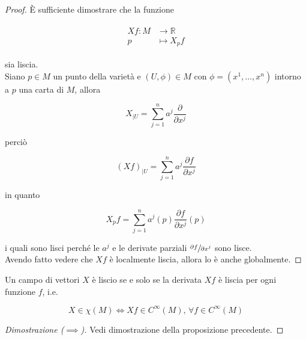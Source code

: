 \begin{proof}
	\`{E} sufficiente dimostrare che la funzione
	
	\begin{align}
		\begin{split}
			X f : M &\to \mathbb{R}\\
			p &\mapsto X_{p} f
		\end{split}
	\end{align}

	sia liscia.\\
	Siano $ p \in M $ un punto della varietà e $ (U,\phi) \in M $ con $ \phi = (x^{1},\dots,x^{n}) $ intorno a $ p $ una carta di $ M $, allora
	
	\begin{equation}
		X_{|U} = \sum_{j=1}^{n} a^{j} \dfrac{\partial}{\partial x^{j}}
	\end{equation}

	perciò
	
	\begin{equation}
		(X f)_{|U} = \sum_{j=1}^{n} a^{j} \dfrac{\partial f}{\partial x^{j}}
	\end{equation}

	in quanto
	
	\begin{equation}
		X_{p} f = \sum_{j=1}^{n} a^{j}(p) \dfrac{\partial f}{\partial x^{j}} (p)
	\end{equation}

	i quali sono lisci perché le $ a^{j} $ e le derivate parziali $ \sfrac{\partial f}{\partial x^{j}} $ sono lisce.\\
	Avendo fatto vedere che $ X f $ è localmente liscia, allora lo è anche globalmente.
\end{proof}

\begin{definition}
	Un campo di vettori $ X $ è liscio se e solo se la derivata $ X f $ è liscia per ogni funzione $ f $, i.e.
	
	\begin{equation}
		X \in \chi(M) \iff X f \in C^{\infty}(M), \, \forall f \in C^{\infty}(M)
	\end{equation}
\end{definition}

\begin{proof}[Dimostrazione ($ \implies $)]
	Vedi dimostrazione della proposizione precedente.
\end{proof}

